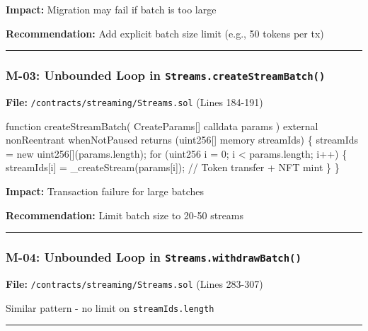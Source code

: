 \documentclass[
]{article}
\newenvironment{Shaded}{}{}
\newcommand{\NormalTok}[1]{#1}
\begin{document}
\textbf{Impact:} Migration may fail if batch is too large

\textbf{Recommendation:} Add explicit batch size limit (e.g., 50 tokens
per tx)

\begin{center}\rule{0.5\linewidth}{0.5pt}\end{center}

\subsubsection{\texorpdfstring{M-03: Unbounded Loop in
\texttt{Streams.createStreamBatch()}}{M-03: Unbounded Loop in Streams.createStreamBatch()}}\label{m-03-unbounded-loop-in-streamscreatestreambatch}

\textbf{File:} \texttt{/contracts/streaming/Streams.sol} (Lines 184-191)

\begin{Shaded}
\begin{Highlighting}[]
\NormalTok{function createStreamBatch(}
\NormalTok{    CreateParams[] calldata params}
\NormalTok{) external nonReentrant whenNotPaused returns (uint256[] memory streamIds) \{}
\NormalTok{    streamIds = new uint256[](params.length);}
\NormalTok{    for (uint256 i = 0; i \textless{} params.length; i++) \{}
\NormalTok{        streamIds[i] = \_createStream(params[i]);  // Token transfer + NFT mint}
\NormalTok{    \}}
\NormalTok{\}}
\end{Highlighting}
\end{Shaded}

\textbf{Impact:} Transaction failure for large batches

\textbf{Recommendation:} Limit batch size to 20-50 streams

\begin{center}\rule{0.5\linewidth}{0.5pt}\end{center}

\subsubsection{\texorpdfstring{M-04: Unbounded Loop in
\texttt{Streams.withdrawBatch()}}{M-04: Unbounded Loop in Streams.withdrawBatch()}}\label{m-04-unbounded-loop-in-streamswithdrawbatch}

\textbf{File:} \texttt{/contracts/streaming/Streams.sol} (Lines 283-307)

Similar pattern - no limit on \texttt{streamIds.length}

\begin{center}\rule{0.5\linewidth}{0.5pt}\end{center}
\end{document}
